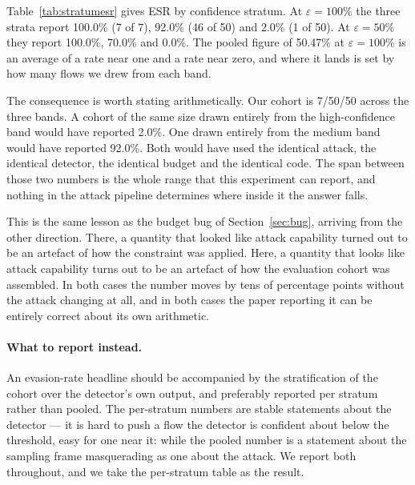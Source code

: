 \documentclass[journal]{IEEEtran}
\theoremstyle{definition}
\newcommand{\CEsrG}{50.47}
\newcommand{\XNBnd}{7}
\newcommand{\XEvBnd}{7}
\newcommand{\XEsrBnd}{100.0}
\newcommand{\XEsrHalfBnd}{100.0}
\newcommand{\XNMed}{50}
\newcommand{\XEvMed}{46}
\newcommand{\XEsrMed}{92.0}
\newcommand{\XEsrHalfMed}{70.0}
\newcommand{\XNHi}{50}
\newcommand{\XEvHi}{1}
\newcommand{\XEsrHi}{2.0}
\newcommand{\XEsrHalfHi}{0.0}
\begin{document}
Table~\ref{tab:stratumesr} gives ESR by confidence stratum. At
$\varepsilon = 100$\% the three strata report \XEsrBnd\%
(\XEvBnd{} of \XNBnd), \XEsrMed\% (\XEvMed{} of \XNMed) and \XEsrHi\%
(\XEvHi{} of \XNHi). At $\varepsilon = 50$\% they report \XEsrHalfBnd\%,
\XEsrHalfMed\% and \XEsrHalfHi\%. The pooled figure of \CEsrG\% at
$\varepsilon = 100$\% is an average of a rate near one and a rate near zero,
and where it lands is set by how many flows we drew from each band.

The consequence is worth stating arithmetically. Our cohort is
\XNBnd{}/\XNMed{}/\XNHi{} across the three bands. A cohort of the same size
drawn entirely from the high-confidence band would have reported \XEsrHi\%. One
drawn entirely from the medium band would have reported \XEsrMed\%. Both would
have used the identical attack, the identical detector, the identical budget and
the identical code. The span between those two numbers is the whole range that
this experiment can report, and nothing in the attack pipeline determines where
inside it the answer falls.

This is the same lesson as the budget bug of Section~\ref{sec:bug}, arriving
from the other direction. There, a quantity that looked like attack capability
turned out to be an artefact of how the constraint was applied. Here, a quantity
that looks like attack capability turns out to be an artefact of how the
evaluation cohort was assembled. In both cases the number moves by tens of
percentage points without the attack changing at all, and in both cases the
paper reporting it can be entirely correct about its own arithmetic.

\paragraph{What to report instead.} An evasion-rate headline should be
accompanied by the stratification of the cohort over the detector's own output,
and preferably reported per stratum rather than pooled. The per-stratum numbers
are stable statements about the detector --- it is hard to push a flow the
detector is confident about below the threshold, easy for one near it: while
the pooled number is a statement about the sampling frame masquerading as one
about the attack. We report both throughout, and we take the per-stratum table
as the result.
\end{document}
